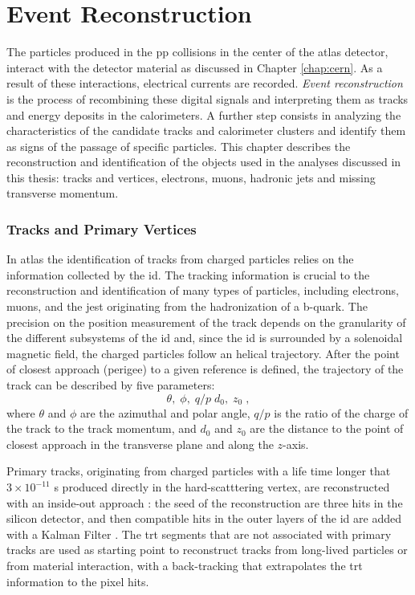\chapter{Event Reconstruction}
\label{sec:event:reco}

The particles produced in the \gls{pp} collisions in the center of the \gls{atlas} detector, interact with the detector material as discussed in Chapter \ref{chap:cern}. As a result of these interactions, electrical currents are recorded. \textit{Event reconstruction} is the process of recombining these digital signals and interpreting them as tracks and energy deposits in the calorimeters. A further step consists in analyzing the characteristics of the candidate tracks and calorimeter clusters and identify them as signs of the passage of specific particles.
This chapter describes the reconstruction and identification of the objects used in the analyses discussed in this thesis: tracks and vertices, electrons, muons, hadronic jets and missing transverse momentum. 


\subsection{Tracks and Primary Vertices}
\label{sec:reco:tracks}

In \gls{atlas} the identification of tracks from charged particles relies on the information collected by the \gls{id}. The tracking information is crucial to the reconstruction and identification of many types of particles, including electrons, muons, and the jest originating from the hadronization of a b-quark. The precision on the position measurement of the track depends on the granularity of the different subsystems of the \gls{id} and, since the \gls{id} is surrounded by a solenoidal magnetic field, the charged particles follow an helical trajectory. After the point of closest approach (perigee) to a given reference is defined, the trajectory of the track can be described by five parameters: 
\begin{equation}
\theta, \; \phi, \; q/p \; d_0, \; z_0 \;,
\end{equation}
\noindent where $\theta$ and $\phi$ are the azimuthal and polar angle, $q/p$ is the ratio of the charge of the track to the track momentum, and $d_0$ and $z_0$ are the distance to the point of closest approach in the transverse plane and along the $z$-axis. 

Primary tracks, originating from charged particles with a life time longer that $3 \times 10^{-11}$ s produced directly in the hard-scatttering vertex, are reconstructed with an inside-out approach \cite{Cornelissen:1020106}: the seed of the reconstruction are three hits in the silicon detector, and then compatible hits in the outer layers of the \gls{id} are added with a Kalman Filter \cite{citeulike:347166,Fruhwirth:1987fm}. The \gls{trt} segments that are not associated with primary tracks are used as starting point to reconstruct tracks from long-lived particles or from material interaction, with a back-tracking that extrapolates the \gls{trt} information to the pixel hits. 

